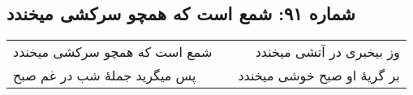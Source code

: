 \begin{center}
\section*{شماره ۹۱: شمع است که همچو سرکشی میخندد}
\label{sec:091}
\begin{longtable}{l p{0.5cm} r}
شمع است که همچو سرکشی میخندد
&&
وز بیخبری در آتشی میخندد
\\
پس میگرید جملهٔ شب در غم صبح
&&
بر گریهٔ او صبح خوشی میخندد
\\
\end{longtable}
\end{center}

